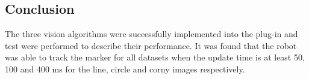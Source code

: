 \subsection{Conclusion}
The three vision algorithms were successfully implemented into the plug-in and test were performed to describe their performance.
It was found that the robot was able to track the marker for all datasets when the update time is at least 50, 100 and 400 ms for the line, circle and corny images respectively.


